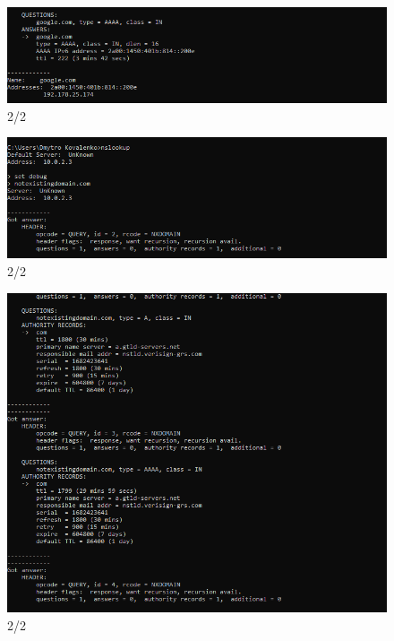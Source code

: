 \documentclass{article}
\begin{document}
\begin{normalsize}
\begin{figure}[H]
	\centering
	\includegraphics{35}
	\caption{2/2}
\end{figure}
\begin{figure}[H]
	\centering
	\includegraphics{51}
	\caption{2/2}
\end{figure}
\begin{figure}[H]
	\centering
	\includegraphics{52}
	\caption{2/2}
\end{figure}
\begin{figure}[H]
	\centering

\end{figure}
\end{normalsize}
\end{document}

